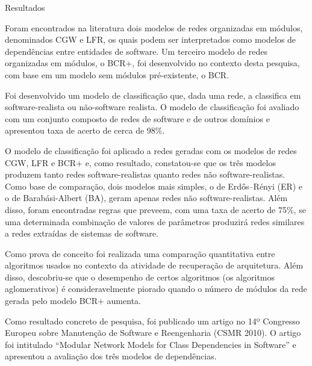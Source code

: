 \begin{section}{Resultados}
	
	Foram encontrados na literatura dois modelos de redes organizadas em módulos, denominados CGW e LFR, os quais podem ser interpretados como modelos de dependências entre entidades de software. Um terceiro modelo de redes organizadas em módulos, o BCR+, foi desenvolvido no contexto desta pesquisa, com base em um modelo sem módulos pré-existente, o BCR.
	
	Foi desenvolvido um modelo de classificação que, dada uma rede, a classifica em software-realista ou não-software realista. O modelo de classificação foi avaliado com um conjunto composto de redes de software e de outros domínios e apresentou taxa de acerto de cerca de 98\%.
	
	O modelo de classificação foi aplicado a redes geradas com os modelos de redes CGW, LFR e BCR+ e, como resultado, constatou-se que os três modelos produzem tanto redes software-realistas quanto redes não software-realistas. Como base de comparação, dois modelos mais simples, o de Erdős–Rényi (ER) e o de Barabási-Albert (BA), geram apenas redes não software-realistas. Além disso, foram encontradas regras que preveem, com uma taxa de acerto de 75\%, se uma determinada combinação de valores de parâmetros produzirá redes similares a redes extraídas de sistemas de software.
	
	Como prova de conceito foi realizada uma comparação quantitativa entre algoritmos usados no contexto da atividade de recuperação de arquitetura. Além disso, descobriu-se que o desempenho de certos algoritmos (os algoritmos aglomerativos) é consideravelmente piorado quando o número de módulos da rede gerada pelo modelo BCR+ aumenta.
	
	Como resultado concreto de pesquisa, foi publicado um artigo no 14º Congresso Europeu sobre Manutenção de Software e Reengenharia (CSMR 2010). O artigo foi intitulado ``Modular Network Models for Class Dependencies in Software'' e apresentou a avaliação dos três modelos de dependências.

	
\end{section}

